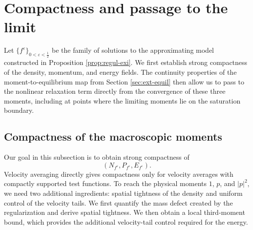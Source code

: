 \documentclass[10pt,reqno]{amsart}
\numberwithin{equation}{section}
\theoremstyle{definition}
\newcommand{\e}{\varepsilon}
\begin{document}
%
%
%
%
%
%

\section{Compactness and passage to the limit}\label{sec:pass-eps}

Let $\{f^\e\}_{0<\e<\frac12}$ be the family of solutions to the approximating model constructed in Proposition \ref{prop:regul-exi}.  We first establish strong compactness of the density, momentum, and energy fields.  The continuity properties of the moment-to-equilibrium map from Section \ref{sec:ext-equil} then allow us to pass to the nonlinear relaxation term directly from the convergence of these three moments, including at points where the limiting moments lie on the saturation boundary.


%
%
%
%
%
%
\subsection{Compactness of the macroscopic moments}


Our goal in this subsection is to obtain strong compactness of
\[
 (N_{f^\e},P_{f^\e},E_{f^\e}).
\]
Velocity averaging directly gives compactness only for velocity averages with compactly supported test functions.  To reach the physical moments $1$, $p$, and $|p|^2$, we need two additional ingredients: spatial tightness of the density and uniform control of the velocity tails.  We first quantify the mass defect created by the regularization and derive spatial tightness.  We then obtain a local third-moment bound, which provides the additional velocity-tail control required for the energy.
\end{document}
